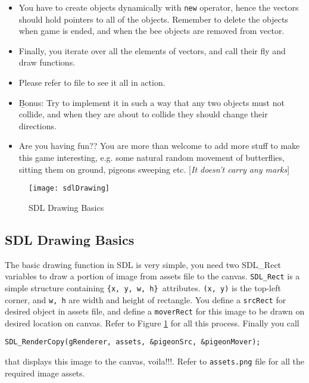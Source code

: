 \documentclass[a4paper,12pt]{article}
\begin{document}
\begin{itemize}
	 	\item You have to create objects dynamically with \texttt{new} operator, hence the vectors should hold pointers to all of the objects. Remember to delete the objects when game is ended, and when the bee objects are removed from vector.
	 	
	 	\item Finally, you iterate over all the elements of vectors, and call their fly and draw functions.
	 	
	 	
	 	\item Please refer to  file to see it all in action.
	 	
	 	\item \b{Bonus}: Try to implement it in such a way that any two objects must not collide, and when they are about to collide they should change their directions.
	 	
	 	\item Are you having fun?? You are more than welcome to add more stuff to make this game interesting, e.g. some natural random movement of butterflies, sitting them on ground, pigeons sweeping etc. [\textit{It doesn't carry any marks}]
	 \end{itemize}
 

	\begin{figure}
		\texttt{[image: sdlDrawing]}
		\caption{SDL Drawing Basics}
		\label{fig:sdlDrawing}
	\end{figure}  

	
	
	\subsection{SDL Drawing Basics}
	
	The basic drawing function in SDL is very simple, you need two SDL\_Rect variables to draw a portion of image from assets file to the canvas. \texttt{SDL\_Rect} is a simple structure containing \texttt{\{x, y, w, h\} }attributes. \texttt{(x, y)} is the top-left corner, and \texttt{w, h} are width and height of rectangle. You define a \texttt{srcRect} for desired object in assets file, and define a \texttt{moverRect} for this image to be drawn on desired location on canvas. Refer to Figure \ref{fig:sdlDrawing} for all this process.  Finally you call 
	
	\noindent \texttt{SDL\_RenderCopy(gRenderer, assets, \&pigeonSrc, \&pigeonMover);}
	
	\noindent that displays this image to the canvas, voila!!!. Refer to \texttt{assets.png} file for all the required image assets.
	
\end{document}
